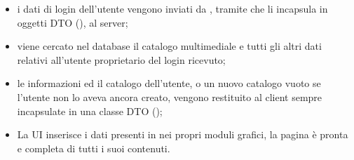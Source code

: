 \begin{itemize}
  \item i dati di login dell'utente vengono inviati da ,
  tramite  che li incapsula in oggetti DTO (),
  al server;
  \item viene cercato nel database il catalogo multimediale e tutti
  gli altri dati relativi all'utente proprietario del login ricevuto;
  \item le informazioni ed il catalogo dell'utente, o un nuovo catalogo vuoto se
  l'utente non lo aveva ancora creato, vengono restituito al client sempre
  incapsulate in una classe DTO ();
  \item La UI  inserisce i dati presenti in 
  nei propri moduli grafici, la pagina \`e pronta e completa di tutti i suoi
  contenuti.
\end{itemize}

